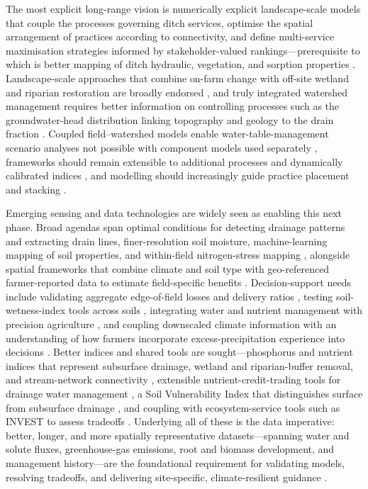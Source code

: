 \documentclass[11pt]{article}
\begin{document}
The most explicit long-range vision is numerically explicit landscape-scale
models that couple the processes governing ditch services, optimise the spatial
arrangement of practices according to connectivity, and define multi-service
maximisation strategies informed by stakeholder-valued rankings---prerequisite
to which is better mapping of ditch hydraulic, vegetation, and sorption
properties \parencite{Dollinger2015,Herzon2008}. Landscape-scale approaches that
combine on-farm change with off-site wetland and riparian restoration are
broadly endorsed \parencite{Blann2009,Goeller2019}, and truly integrated
watershed management requires better information on controlling processes such
as the groundwater-head distribution linking topography and geology to the drain
fraction \parencite{Mahmood2023}. Coupled field--watershed models enable
water-table-management scenario analyses not possible with component models used
separately \parencite{Dayyani2010}, frameworks should remain extensible to
additional processes and dynamically calibrated indices
\parencite{Basu2010,Tao2025,Verma2014}, and modelling should increasingly guide
practice placement and stacking
\parencite{Kröger2013,Tomer2015,Lemke2011,McDowell2021,King2022,Roley2016}.

Emerging sensing and data technologies are widely seen as enabling this next
phase. Broad agendas span optimal conditions for detecting drainage patterns and
extracting drain lines, finer-resolution soil moisture, machine-learning mapping
of soil properties, and within-field nitrogen-stress mapping
\parencite{Khanal2020}, alongside spatial frameworks that combine climate and
soil type with geo-referenced farmer-reported data to estimate field-specific
benefits \parencite{Cassman2025}. Decision-support needs include validating
aggregate edge-of-field losses and delivery ratios \parencite{Reid2018},
testing soil-wetness-index tools across soils \parencite{Julien2023}, integrating
water and nutrient management with precision agriculture \parencite{Jung2024},
and coupling downscaled climate information with an understanding of how farmers
incorporate excess-precipitation experience into decisions \parencite{Morton2015}.
Better indices and shared tools are sought---phosphorus and nutrient indices that
represent subsurface drainage, wetland and riparian-buffer removal, and
stream-network connectivity \parencite{Buczko2007,Pärn2012}, extensible
nutrient-credit-trading tools for drainage water management \parencite{Negm2016},
a Soil Vulnerability Index that distinguishes surface from subsurface drainage
\parencite{Baffaut2020}, and coupling with ecosystem-service tools such as INVEST
to assess tradeoffs \parencite{McLellan2015}. Underlying all of these is the data
imperative: better, longer, and more spatially representative datasets---spanning
water and solute fluxes, greenhouse-gas emissions, root and biomass development,
and management history---are the foundational requirement for validating models,
resolving tradeoffs, and delivering site-specific, climate-resilient guidance
\parencite{Ma2025,SKAGGS1994,Deng2011}.

\printbibliography
\end{document}
